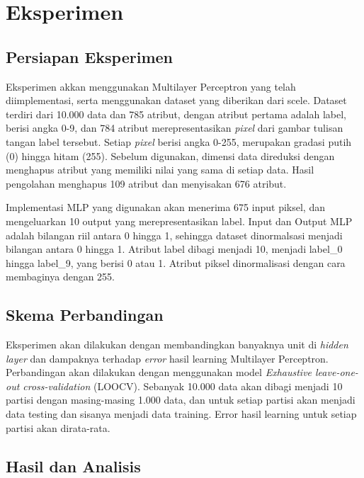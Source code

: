 \section{Eksperimen}

	\subsection{Persiapan Eksperimen}
	Eksperimen akkan menggunakan Multilayer Perceptron yang telah diimplementasi, serta menggunakan dataset yang diberikan dari scele. Dataset terdiri dari 10.000 data
	dan 785 atribut, dengan atribut pertama adalah label, berisi angka 0-9, dan 784 atribut merepresentasikan \textit{pixel} dari gambar tulisan tangan label tersebut.
	Setiap \textit{pixel} berisi angka 0-255, merupakan gradasi putih (0) hingga hitam (255). Sebelum digunakan, dimensi data direduksi dengan menghapus atribut yang 
	memiliki nilai yang sama di setiap data. Hasil pengolahan menghapus 109 atribut dan menyisakan 676 atribut. 

	Implementasi MLP yang digunakan akan menerima 675 input piksel, dan mengeluarkan 10 output yang merepresentasikan label. Input dan Output MLP adalah bilangan riil 
	antara 0 hingga 1, sehingga dataset dinormalsasi menjadi bilangan antara 0 hingga 1. Atribut label dibagi menjadi 10, menjadi label\_0 hingga label\_9, yang berisi
	0 atau 1. Atribut piksel dinormalisasi dengan cara membaginya dengan 255.

	\subsection{Skema Perbandingan}
	Eksperimen akan dilakukan dengan membandingkan banyaknya unit di \textit{hidden layer} dan dampaknya terhadap \textit{error} hasil learning Multilayer Perceptron. 
	Perbandingan akan dilakukan dengan menggunakan model \textit{Exhaustive leave-one-out cross-validation} (LOOCV). Sebanyak 10.000 data akan dibagi menjadi 10 partisi
	dengan masing-masing 1.000 data, dan untuk setiap partisi akan menjadi data testing dan sisanya menjadi data training. Error hasil learning untuk setiap partisi akan dirata-rata.

	\subsection{Hasil dan Analisis}
	\lipsum[1]